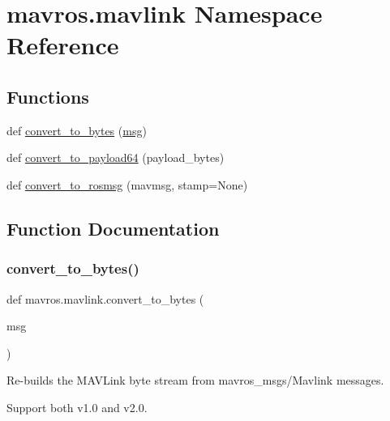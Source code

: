 \hypertarget{namespacemavros_1_1mavlink}{}\section{mavros.\+mavlink Namespace Reference}
\label{namespacemavros_1_1mavlink}
\subsection*{Functions}
\begin{DoxyCompactItemize}
\item 
def \mbox{\hyperlink{namespacemavros_1_1mavlink_a4b79e6de8d1e2e3b2cec94d36e5b0dca}{convert\+\_\+to\+\_\+bytes}} (\mbox{\hyperlink{stratnode_8cpp_a82cfe4ed9bc9e1b07c8bf209c324d85b}{msg}})
\item 
def \mbox{\hyperlink{namespacemavros_1_1mavlink_a1be406085dd2e7230daf05c7e2877ae0}{convert\+\_\+to\+\_\+payload64}} (payload\+\_\+bytes)
\item 
def \mbox{\hyperlink{namespacemavros_1_1mavlink_a2ab39b2014ffed0a13abff04b4170fc3}{convert\+\_\+to\+\_\+rosmsg}} (mavmsg, stamp=None)
\end{DoxyCompactItemize}


\subsection{Function Documentation}
\mbox{\label{namespacemavros_1_1mavlink_a4b79e6de8d1e2e3b2cec94d36e5b0dca}} 
\subsubsection{\texorpdfstring{convert\_to\_bytes()}{convert\_to\_bytes()}}
{\footnotesize\ttfamily def mavros.\+mavlink.\+convert\+\_\+to\+\_\+bytes (\begin{DoxyParamCaption}\item[{}]{msg }\end{DoxyParamCaption})}

\begin{DoxyVerb}Re-builds the MAVLink byte stream from mavros_msgs/Mavlink messages.

Support both v1.0 and v2.0.
\end{DoxyVerb}
 


